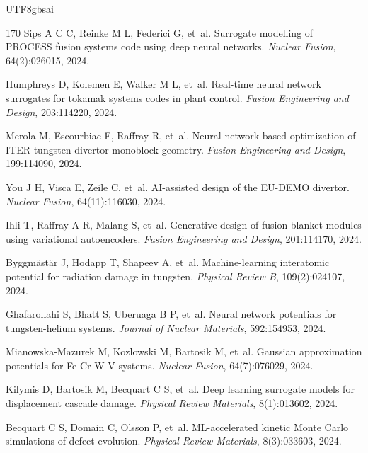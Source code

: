 \documentclass[12pt,a4paper]{article}
\begin{document}
\begin{CJK}{UTF8}{gbsai}
\begin{thebibliography}{170}
Sips A C C, Reinke M L, Federici G, et~al.
\newblock Surrogate modelling of PROCESS fusion systems code using deep neural networks.
\newblock \textit{Nuclear Fusion}, 64(2):026015, 2024.

Humphreys D, Kolemen E, Walker M L, et~al.
\newblock Real-time neural network surrogates for tokamak systems codes in plant control.
\newblock \textit{Fusion Engineering and Design}, 203:114220, 2024.

Merola M, Escourbiac F, Raffray R, et~al.
\newblock Neural network-based optimization of ITER tungsten divertor monoblock geometry.
\newblock \textit{Fusion Engineering and Design}, 199:114090, 2024.

You J H, Visca E, Zeile C, et~al.
\newblock AI-assisted design of the EU-DEMO divertor.
\newblock \textit{Nuclear Fusion}, 64(11):116030, 2024.

Ihli T, Raffray A R, Malang S, et~al.
\newblock Generative design of fusion blanket modules using variational autoencoders.
\newblock \textit{Fusion Engineering and Design}, 201:114170, 2024.

Byggm\"{a}st\"{a}r J, Hodapp T, Shapeev A, et~al.
\newblock Machine-learning interatomic potential for radiation damage in tungsten.
\newblock \textit{Physical Review B}, 109(2):024107, 2024.

Ghafarollahi S, Bhatt S, Uberuaga B P, et~al.
\newblock Neural network potentials for tungsten-helium systems.
\newblock \textit{Journal of Nuclear Materials}, 592:154953, 2024.

Mianowska-Mazurek M, Kozlowski M, Bartosik M, et~al.
\newblock Gaussian approximation potentials for Fe-Cr-W-V systems.
\newblock \textit{Nuclear Fusion}, 64(7):076029, 2024.

Kilymis D, Bartosik M, Becquart C S, et~al.
\newblock Deep learning surrogate models for displacement cascade damage.
\newblock \textit{Physical Review Materials}, 8(1):013602, 2024.

Becquart C S, Domain C, Olsson P, et~al.
\newblock ML-accelerated kinetic Monte Carlo simulations of defect evolution.
\newblock \textit{Physical Review Materials}, 8(3):033603, 2024.


\end{thebibliography}
\end{CJK}
\end{document}
